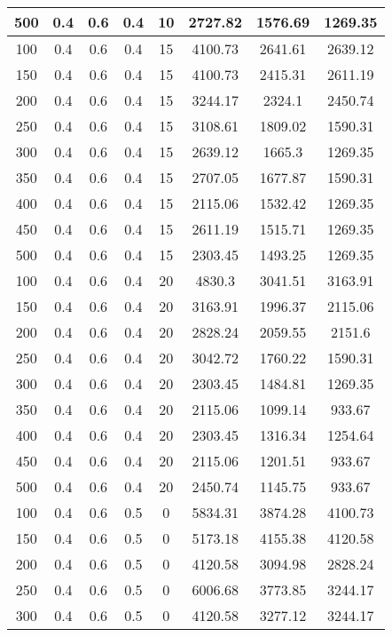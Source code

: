 \documentclass[a4paper, 12pt]{extreport}
\begin{document}
\begin{itemize}
\begin{longtable}{|c|c|c|c|c|c|c|c|}
			500 & 0.4 & 0.6 & 0.4 & 10 & 2727.82 & 1576.69 & 1269.35 \\\hline
			100 & 0.4 & 0.6 & 0.4 & 15 & 4100.73 & 2641.61 & 2639.12 \\\hline
			150 & 0.4 & 0.6 & 0.4 & 15 & 4100.73 & 2415.31 & 2611.19 \\\hline
			200 & 0.4 & 0.6 & 0.4 & 15 & 3244.17 & 2324.1 & 2450.74 \\\hline
			250 & 0.4 & 0.6 & 0.4 & 15 & 3108.61 & 1809.02 & 1590.31 \\\hline
			300 & 0.4 & 0.6 & 0.4 & 15 & 2639.12 & 1665.3 & 1269.35 \\\hline
			350 & 0.4 & 0.6 & 0.4 & 15 & 2707.05 & 1677.87 & 1590.31 \\\hline
			400 & 0.4 & 0.6 & 0.4 & 15 & 2115.06 & 1532.42 & 1269.35 \\\hline
			450 & 0.4 & 0.6 & 0.4 & 15 & 2611.19 & 1515.71 & 1269.35 \\\hline
			500 & 0.4 & 0.6 & 0.4 & 15 & 2303.45 & 1493.25 & 1269.35 \\\hline
			100 & 0.4 & 0.6 & 0.4 & 20 & 4830.3 & 3041.51 & 3163.91 \\\hline
			150 & 0.4 & 0.6 & 0.4 & 20 & 3163.91 & 1996.37 & 2115.06 \\\hline
			200 & 0.4 & 0.6 & 0.4 & 20 & 2828.24 & 2059.55 & 2151.6 \\\hline
			250 & 0.4 & 0.6 & 0.4 & 20 & 3042.72 & 1760.22 & 1590.31 \\\hline
			300 & 0.4 & 0.6 & 0.4 & 20 & 2303.45 & 1484.81 & 1269.35 \\\hline
			350 & 0.4 & 0.6 & 0.4 & 20 & 2115.06 & 1099.14 & 933.67 \\\hline
			400 & 0.4 & 0.6 & 0.4 & 20 & 2303.45 & 1316.34 & 1254.64 \\\hline
			450 & 0.4 & 0.6 & 0.4 & 20 & 2115.06 & 1201.51 & 933.67 \\\hline
			500 & 0.4 & 0.6 & 0.4 & 20 & 2450.74 & 1145.75 & 933.67 \\\hline
			100 & 0.4 & 0.6 & 0.5 & 0 & 5834.31 & 3874.28 & 4100.73 \\\hline
			150 & 0.4 & 0.6 & 0.5 & 0 & 5173.18 & 4155.38 & 4120.58 \\\hline
			200 & 0.4 & 0.6 & 0.5 & 0 & 4120.58 & 3094.98 & 2828.24 \\\hline
			250 & 0.4 & 0.6 & 0.5 & 0 & 6006.68 & 3773.85 & 3244.17 \\\hline
			300 & 0.4 & 0.6 & 0.5 & 0 & 4120.58 & 3277.12 & 3244.17 \\\hline

\end{longtable}
\end{itemize}
\end{document}
